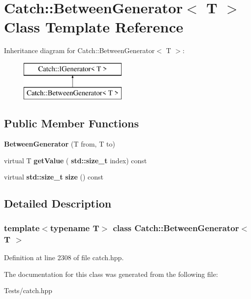 \hypertarget{class_catch_1_1_between_generator}{}\section{Catch\+:\+:Between\+Generator$<$ T $>$ Class Template Reference}
\label{class_catch_1_1_between_generator}
Inheritance diagram for Catch\+:\+:Between\+Generator$<$ T $>$\+:\begin{figure}[H]
\begin{center}
\leavevmode
\includegraphics[height=2.000000cm]{class_catch_1_1_between_generator}
\end{center}
\end{figure}
\subsection*{Public Member Functions}
\begin{DoxyCompactItemize}
\item 
\mbox{\label{class_catch_1_1_between_generator_a835a057d691ae37caef660624099b51c}} 
{\bfseries Between\+Generator} (T from, T to)
\item 
\mbox{\label{class_catch_1_1_between_generator_a913f74bb0c23b3bc0127abfffdabbd94}} 
virtual T {\bfseries get\+Value} (\textbf{ std\+::size\+\_\+t} index) const
\item 
\mbox{\label{class_catch_1_1_between_generator_af65a1fe51f9b1106fc676e3dd189adb6}} 
virtual \textbf{ std\+::size\+\_\+t} {\bfseries size} () const
\end{DoxyCompactItemize}


\subsection{Detailed Description}
\subsubsection*{template$<$typename T$>$\newline
class Catch\+::\+Between\+Generator$<$ T $>$}



Definition at line 2308 of file catch.\+hpp.



The documentation for this class was generated from the following file\+:\begin{DoxyCompactItemize}
\item 
Tests/catch.\+hpp\end{DoxyCompactItemize}
